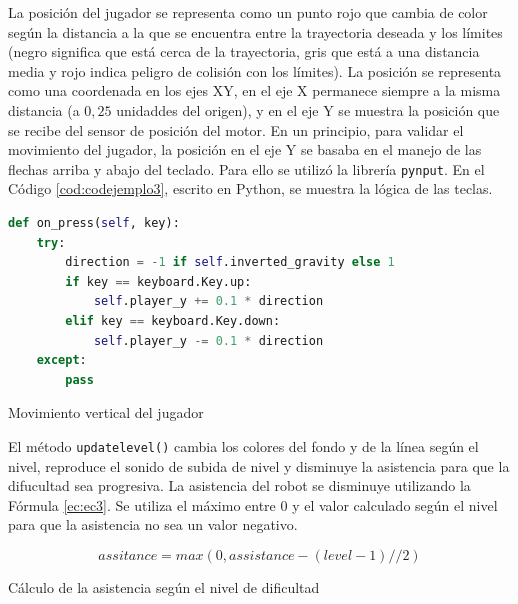 La posición del jugador se representa como un punto rojo que cambia de color según la distancia a la que se encuentra entre la trayectoria deseada y los límites (negro significa que está cerca de la trayectoria, gris que está a una distancia media y rojo indica peligro de colisión con los límites).
La posición se representa como una coordenada en los ejes XY, en el eje X permanece siempre a la misma distancia (a $0,25$ unidaddes del origen), y en el eje Y se muestra la posición que se recibe del sensor de posición del motor.
En un principio, para validar el movimiento del jugador, la posición en el eje Y se basaba en el manejo de las flechas arriba y abajo del teclado.
Para ello se utilizó la librería \verb|pynput|.
En el Código \ref{cod:codejemplo3}, escrito en Python, se muestra la lógica de las teclas.

\begin{code}[h]
\begin{lstlisting}[language=Python]
def on_press(self, key):
	try:
		direction = -1 if self.inverted_gravity else 1
		if key == keyboard.Key.up:
			self.player_y += 0.1 * direction
		elif key == keyboard.Key.down:
			self.player_y -= 0.1 * direction
	except:
		pass
\end{lstlisting}
\caption[Movimiento vertical del jugador]{Movimiento vertical del jugador}
\label{cod:codejemplo3}
\end{code}

El método \verb|updatelevel()| cambia los colores del fondo y de la línea según el nivel, reproduce el sonido de subida de nivel y disminuye la asistencia para que la difucultad sea progresiva.
La asistencia del robot se disminuye utilizando la Fórmula \ref{ec:ec3}.
Se utiliza el máximo entre 0 y el valor calculado según el nivel para que la asistencia no sea un valor negativo.

\begin{myequation}[h]
\begin{equation}
assitance = max(0, assistance - (level - 1) // 2)
\nonumber
\label{ec:ec3}
\end{equation}
\caption[Cálculo de la asistencia según el nivel de dificultad]{Cálculo de la asistencia según el nivel de dificultad}
\end{myequation}

